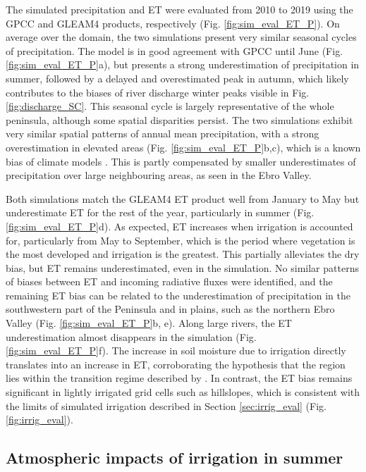 The simulated precipitation and ET were evaluated from 2010 to 2019 using the GPCC and GLEAM4 products, respectively (Fig. \ref{fig:sim_eval_ET_P}).
On average over the domain, the two simulations present very similar seasonal cycles of precipitation. The model is in good agreement with GPCC until June (Fig. \ref{fig:sim_eval_ET_P}a), but presents a strong underestimation of precipitation in summer, followed by a delayed and overestimated peak in autumn, which likely contributes to the biases of river discharge winter peaks visible in Fig. \ref{fig:discharge_SC}. 
This seasonal cycle is largely representative of the whole peninsula, although some spatial disparities persist. The two simulations exhibit very similar spatial patterns of annual mean precipitation, with a strong overestimation in elevated areas (Fig. \ref{fig:sim_eval_ET_P}b,c), which is a known bias of climate models \citep{arjdal_modeling_2024, adhikari_evaluation_2024}.
This is partly compensated by smaller underestimates of precipitation over large neighbouring areas, as seen in the Ebro Valley.

Both simulations match the GLEAM4 ET product well from January to May but underestimate ET for the rest of the year, particularly in summer (Fig. \ref{fig:sim_eval_ET_P}d). As expected, ET increases when irrigation is accounted for, particularly from May to September, which is the period where vegetation is the most developed and irrigation is the greatest. This partially alleviates the dry bias, but ET remains underestimated, even in the \irr simulation.
No similar patterns of biases between ET and incoming radiative fluxes were identified, and the remaining ET bias can be related to the underestimation of precipitation in the southwestern part of the Peninsula and in plains, such as the northern Ebro Valley (Fig. \ref{fig:sim_eval_ET_P}b, e). 
Along large rivers, the ET underestimation almost disappears in the \irr simulation (Fig. \ref{fig:sim_eval_ET_P}f). The increase in soil moisture due to irrigation directly translates into an increase in ET, corroborating the hypothesis that the region lies within the transition regime described by \citet{Budyko_1956}. 
In contrast, the ET bias remains significant in lightly irrigated grid cells such as hillslopes, which is consistent with the limits of simulated irrigation described in Section \ref{sec:irrig_eval} (Fig. \ref{fig:irrig_eval}).

\subsection{Atmospheric impacts of irrigation in summer}

